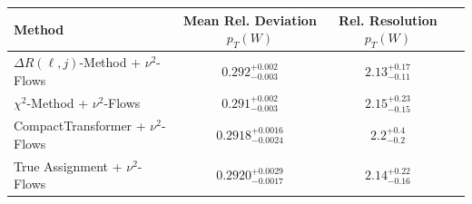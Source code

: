     \begin{tabular}{lccc}
        \toprule
        Method & Mean Rel. Deviation $p_{T}(W)$ & Rel. Resolution $p_{T}(W)$ \\
        \midrule
        $\Delta R(\ell,j)$-Method + $\nu^2$-Flows & $0.292^{+0.002}_{-0.003}$ & $2.13^{+0.17}_{-0.11}$ \\
        $\chi^2$-Method + $\nu^2$-Flows & $0.291^{+0.002}_{-0.003}$ & $2.15^{+0.23}_{-0.15}$ \\
        CompactTransformer + $\nu^2$-Flows & $0.2918^{+0.0016}_{-0.0024}$ & $2.2^{+0.4}_{-0.2}$ \\
        True Assignment + $\nu^2$-Flows & $0.2920^{+0.0029}_{-0.0017}$ & $2.14^{+0.22}_{-0.16}$ \\
        \bottomrule
    \end{tabular}